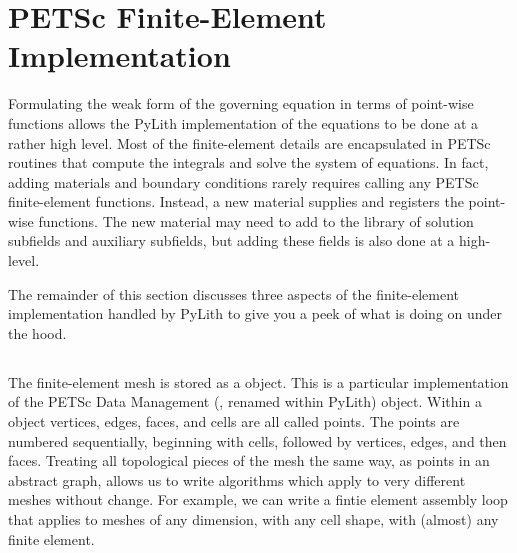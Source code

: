\section{PETSc Finite-Element Implementation}

Formulating the weak form of the governing equation in terms of
point-wise functions allows the PyLith implementation of the equations
to be done at a rather high level. Most of the finite-element details
are encapsulated in PETSc routines that compute the integrals and
solve the system of equations. In fact, adding materials and boundary
conditions rarely requires calling any PETSc finite-element
functions. Instead, a new material supplies and registers the
point-wise functions. The new material may need to add to the library
of solution subfields and auxiliary subfields, but adding these fields
is also done at a high-level.

The remainder of this section discusses three aspects of the
finite-element implementation handled by PyLith to give you a peek of
what is doing on under the hood.



\subsection{}

The finite-element mesh is stored as a  object. This is
a particular implementation of the PETSc Data Management (,
renamed  within PyLith) object. Within a
 object vertices, edges, faces, and cells are all
called points. The points are numbered sequentially, beginning with
cells, followed by vertices, edges, and then faces. Treating all
topological pieces of the mesh the same way, as points in an abstract
graph, allows us to write algorithms which apply to very different
meshes without change. For example, we can write a fintie element
assembly loop that applies to meshes of any dimension, with any cell
shape, with (almost) any finite element.

